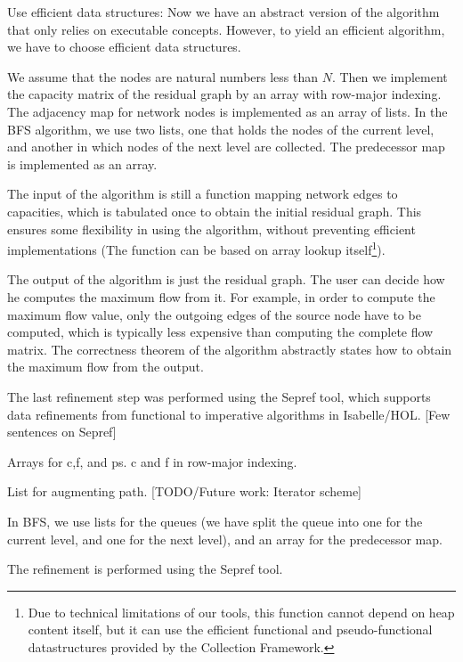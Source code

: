 \documentclass{llncs}
\begin{document}
      
    Use efficient data structures:
      Now we have an abstract version of the algorithm that only relies on executable concepts.
      However, to yield an efficient algorithm, we have to choose efficient data structures. 
      
      We assume that the nodes are natural numbers less than $N$. 
      Then we implement the capacity matrix of the residual graph by an array with row-major indexing. 
      The adjacency map for network nodes is implemented as an array of lists. 
      In the BFS algorithm, we use two lists, one that holds the nodes of the current level, and another 
      in which nodes of the next level are collected. The predecessor map is implemented as an array.
      
      The input of the algorithm is still a function mapping network edges to capacities, which is tabulated once 
      to obtain the initial residual graph. This ensures some flexibility in using the algorithm, without preventing 
      efficient implementations (The function can be based on array lookup itself\footnote{Due to technical limitations of our tools, this function 
        cannot depend on heap content itself, but it can use the efficient functional and pseudo-functional datastructures provided by the Collection Framework.}).
      
      The output of the algorithm is just the residual graph. The user can decide how he computes the maximum flow from it. For example,
      in order to compute the maximum flow value, only the outgoing edges of the source node have to be computed, which is typically less 
      expensive than computing the complete flow matrix. The correctness theorem of the algorithm abstractly states how to obtain the maximum flow from the output.

      The last refinement step was performed using the Sepref tool, which supports data refinements from functional to imperative algorithms in Isabelle/HOL.
      [Few sentences on Sepref]
      
      Arrays for c,f, and ps. c and f in row-major indexing.
      
      List for augmenting path. [TODO/Future work: Iterator scheme]
  
      In BFS, we use lists for the queues (we have split the queue into one for 
        the current level, and one for the next level), and an array for the predecessor map. 
  
      The refinement is performed using the Sepref tool.
\end{document}
